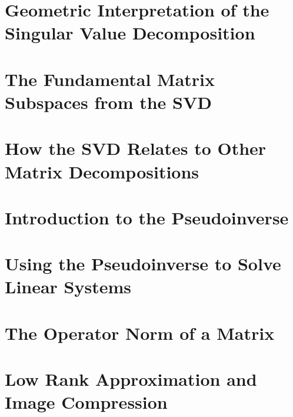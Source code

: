 \documentclass{article}
\begin{document}
\section{Geometric Interpretation of the Singular Value Decomposition}
\section{The Fundamental Matrix Subspaces from the SVD}
\section{How the SVD Relates to Other Matrix Decompositions}
\section{Introduction to the Pseudoinverse}
\section{Using the Pseudoinverse to Solve Linear Systems}
\section{The Operator Norm of a Matrix}
\section{Low Rank Approximation and Image Compression}

\pagebreak
\end{document}
